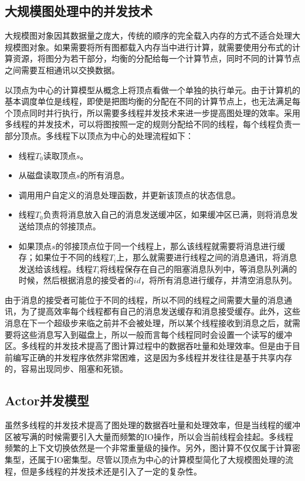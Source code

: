 \subsection{大规模图处理中的并发技术}

大规模图对象因其数据量之庞大，传统的顺序的完全载入内存的方式不适合处理大规模图对象。如果需要将所有图都载入内存当中进行计算，就需要使用分布式的计算资源，将图分为若干部分，均衡的分配给每一个计算节点，同时不同的计算节点之间需要互相通讯以交换数据。

以顶点为中心的计算模型从概念上将顶点看做一个单独的执行单元。由于计算机的基本调度单位是线程，即使是把图均衡的分配在不同的计算节点上，也无法满足每个顶点同时并行执行，所以需要多线程并发技术来进一步提高图处理的效率。采用多线程的并发技术，可以将图按照一定的规则分配给不同的线程，每个线程负责一部分顶点。多线程下以顶点为中心的处理流程如下：
\begin{itemize}
\item 线程$T_0$读取顶点$s$。
\item 从磁盘读取顶点$s$的所有消息。
\item 调用用户自定义的消息处理函数，并更新该顶点的状态信息。
\item 线程$T_0$负责将消息放入自己的消息发送缓冲区，如果缓冲区已满，则将消息发送给顶点的邻接顶点。
\item 如果顶点$s$的邻接顶点位于同一个线程上，那么该线程就需要将消息进行缓存；如果位于不同的线程$T_i$上，那么就需要进行线程之间的消息通讯，将消息发送给该线程。线程$T_i$将线程保存在自己的阻塞消息队列中，等消息队列满的时候，然后根据消息的接受者的$id$，将所有消息进行缓存，并清空消息队列。
\end{itemize}

由于消息的接受者可能位于不同的线程，所以不同的线程之间需要大量的消息通讯，为了提高效率每个线程都有自己的消息发送缓存和消息接受缓存。此外，这些消息在下一个超级步来临之前并不会被处理，所以某个线程接收到消息之后，就需要将这些消息写入到磁盘上，所以一般而言每个线程同时会设置一个读写的缓冲区。多线程的并发技术提高了图计算过程中的数据吞吐量和处理效率。但是由于目前编写正确的并发程序依然非常困难，这是因为多线程并发往往是基于共享内存的，容易出现同步、阻塞和死锁。

\subsection{Actor并发模型}

虽然多线程的并发技术提高了图处理的数据吞吐量和处理效率，但是当线程的缓冲区被写满的时候需要引入大量而频繁的IO操作，所以会当前线程会挂起。多线程频繁的上下文切换依然是一个非常重量级的操作。另外，图计算不仅仅属于计算密集型，还属于IO密集型。尽管以顶点为中心的计算模型简化了大规模图处理的流程，但是多线程的并发技术还是引入了一定的复杂性。

